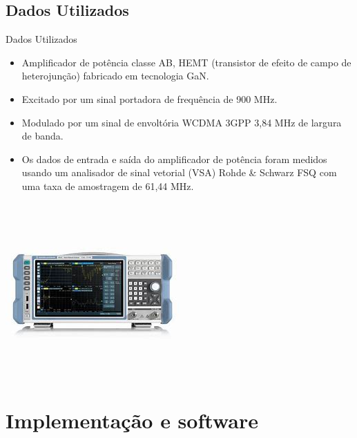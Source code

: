 \documentclass{if-beamer}
\begin{document}
\subsection{Dados Utilizados}
\begin{frame}{Dados Utilizados}
	\begin{minipage}{0.5\textwidth}
		
		
	\end{minipage}%
	\hspace{0.04\textwidth}
	\begin{minipage}{0.5\textwidth}
		\begin{itemize}
			\item Amplificador de potência classe AB, HEMT (transistor de efeito de campo de heterojunção) fabricado em tecnologia GaN.
			\item Excitado por um sinal portadora de frequência de 900	MHz.
			\item Modulado por um sinal de envoltória WCDMA 3GPP 3,84 MHz de largura de banda.
			\item Os dados de entrada e saída do amplificador de potência foram medidos usando um analisador de sinal vetorial (VSA) Rohde \& Schwarz FSQ com uma taxa de amostragem de 61,44 MHz.
		\end{itemize}
	\end{minipage}
	\begin{minipage}{0.5\textwidth}
		\begin{center}		
		\includegraphics[scale=0.4]{analisador.jpeg}
		\end{center}
		
	\end{minipage}%
\end{frame}

\section{Implementação e software}
\end{document}
